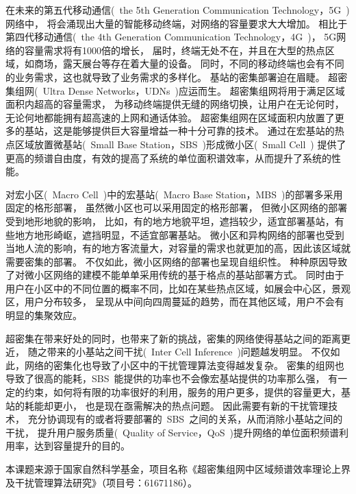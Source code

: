 

在未来的第五代移动通信(~the 5th Generation Communication Technology，5G~)网络中，
将会涌现出大量的智能移动终端，对网络的容量要求大大增加。
相比于第四代移动通信(~the 4th Generation Communication Technology，4G~)，
5G网络的容量需求将有1000倍的增长，
届时，终端无处不在，并且在大型的热点区域，如商场，露天展台等存在着大量的设备。
同时，不同的移动终端也会有不同的业务需求，这也就导致了业务需求的多样化。
基站的密集部署迫在眉睫。
超密集组网(~Ultra Dense Networks，UDNs~)应运而生。
超密集组网将用于满足区域面积内超高的容量需求，
为移动终端提供无缝的网络切换，让用户在无论何时，无论何地都能拥有超高速的上网和通话体验。
超密集组网在区域面积内放置了更多的基站，这是能够提供巨大容量增益一种十分可靠的技术。
通过在宏基站的热点区域放置微基站(~Small Base Station，SBS~)形成微小区(~Small Cell~)
提供了更高的频谱自由度，有效的提高了系统的单位面积谱效率，从而提升了系统的性能。

对宏小区(~Macro Cell~)中的宏基站(~Macro Base Station，MBS~)的部署多采用固定的格形部署，
虽然微小区也可以采用固定的格形部署，
但微小区网络的部署受到地形地貌的影响，
比如，有的地方地貌平坦，遮挡较少，适宜部署基站，有些地方地形崎岖，遮挡明显，不适宜部署基站。
微小区和异构网络的部署也受到当地人流的影响，有的地方客流量大，对容量的需求也就更加的高，因此该区域就需要密集的部署。
不仅如此，微小区网络的部署也呈现自组织性。
种种原因导致了对微小区网络的建模不能单单采用传统的基于格点的基站部署方式。
同时由于用户在小区中的不同位置的概率不同，比如在某些热点区域，如展会中心区，景观区，用户分布较多，
呈现从中间向四周蔓延的趋势，而在其他区域，用户不会有明显的集聚效应。


超密集在带来好处的同时，也带来了新的挑战，密集的网络使得基站之间的距离更近，
随之带来的小基站之间干扰(~Inter Cell Inference~)问题越发明显。
不仅如此，网络的密集化也导致了小区中的干扰管理算法变得越发复杂。
密集的组网也导致了很高的能耗，SBS~能提供的功率也不会像宏基站提供的功率那么强，
有一定的约束，如何将有限的功率很好的利用，服务的用户更多，提供的容量更大，基站的耗能却更小，
也是现在亟需解决的热点问题。
因此需要有新的干扰管理技术，
充分协调现有的或者将要部署的~SBS~之间的关系，从而消除小基站之间的干扰，
提升用户服务质量(~Quality of Service，QoS~)提升网络的单位面积频谱利用率，达到容量提升的目的。


本课题来源于国家自然科学基金，项目名称《超密集组网中区域频谱效率理论上界及干扰管理算法研究》（项目号：61671186）。

